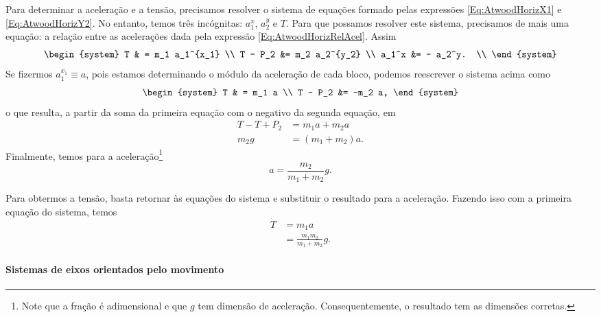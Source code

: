 Para determinar a aceleração e a tensão, precisamos resolver o sistema de equações formado pelas expressões \eqref{Eq:AtwoodHorizX1} e \eqref{Eq:AtwoodHorizY2}. No entanto, temos três incógnitas: $a_1^x$, $a_2^y$ e $T$. Para que possamos resolver este sistema, precisamos de mais uma equação: a relação entre as acelerações dada pela expressão \ref{Eq:AtwoodHorizRelAcel}. Assim
\begin{equation}
\begin{system}
T & = m_1 a_1^{x_1} \\
T - P_2 &= m_2 a_2^{y_2} \\
a_1^x &= - a_2^y. \\
\end{system}
\end{equation}
%
Se fizermos $a_1^{x_1} \equiv a$, pois estamos determinando o módulo da aceleração de cada bloco, podemos reescrever o sistema acima como
\begin{equation}
\begin{system}
T & = m_1 a \\
T - P_2 &= -m_2 a,
\end{system}
\end{equation}
%
o que resulta, a partir da soma da primeira equação com o negativo da segunda equação, em
\begin{align}
    T - T + P_2 &= m_1 a + m_2 a \\
    m_2 g &= (m_1 + m_2) a.
\end{align}
%
Finalmente, temos para a aceleração\footnote{Note que a fração é adimensional e que $g$ tem dimensão de aceleração. Consequentemente, o resultado tem as dimensões corretas.}
\begin{equation}\label{Eq:MaquinaAtwoodHorizResultAcel}
    a = \frac{m_2}{m_1+m_2} g.
\end{equation}

Para obtermos a tensão, basta retornar às equações do sistema e substituir o resultado para a aceleração. Fazendo isso com a primeira equação do sistema, temos
\begin{align}
    T &= m_1 a\\
    &= \frac{m_1m_2}{m_1+m_2} g. \label{Eq:MaquinaAtwoodHorizResultTensao}
\end{align}

\paragraph{Sistemas de eixos orientados pelo movimento}

